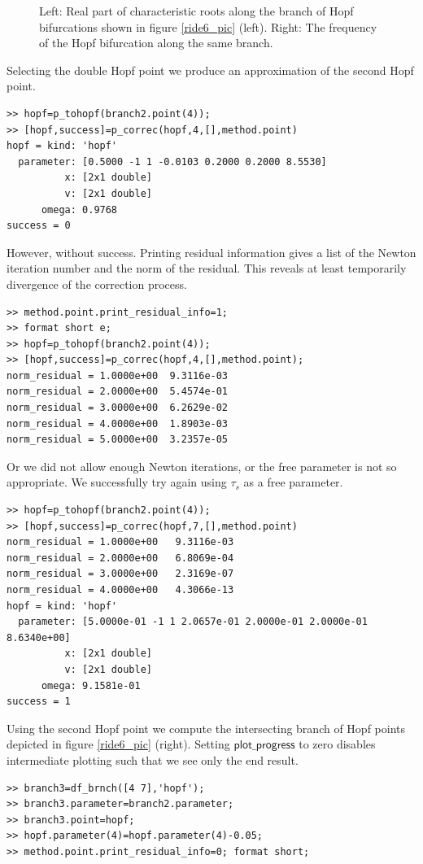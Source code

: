 \documentclass[10pt]{article}
\gdef \parm#1{{\mathsf{#1}}}
\begin{document}
{\begin{figure}[h]
\begin{center}
\end{center}
\caption{\small\label{ride7+8_pic}Left:
Real part of characteristic roots along the branch of Hopf
bifurcations shown in figure \ref{ride6_pic} (left). Right:
The frequency of the Hopf bifurcation along the same branch.} 
\end{figure}
Selecting the double Hopf point we produce an approximation of the
second Hopf point.
{\small\begin{verbatim}
>> hopf=p_tohopf(branch2.point(4));
>> [hopf,success]=p_correc(hopf,4,[],method.point)
hopf = kind: 'hopf'
  parameter: [0.5000 -1 1 -0.0103 0.2000 0.2000 8.5530]
          x: [2x1 double]
          v: [2x1 double]
      omega: 0.9768
success = 0
\end{verbatim}}
However, without success. Printing residual information
gives a list of the Newton iteration number and the
norm of the residual. This reveals 
at least temporarily divergence
of the correction process.
{\small\begin{verbatim}
>> method.point.print_residual_info=1;
>> format short e;
>> hopf=p_tohopf(branch2.point(4));
>> [hopf,success]=p_correc(hopf,4,[],method.point);
norm_residual = 1.0000e+00  9.3116e-03
norm_residual = 2.0000e+00  5.4574e-01
norm_residual = 3.0000e+00  6.2629e-02
norm_residual = 4.0000e+00  1.8903e-03
norm_residual = 5.0000e+00  3.2357e-05
\end{verbatim}}
Or we did not allow enough Newton iterations, or the free parameter
is not so appropriate.
We successfully try again using $\tau_s$ as a free parameter.
{\small\begin{verbatim}
>> hopf=p_tohopf(branch2.point(4));
>> [hopf,success]=p_correc(hopf,7,[],method.point)
norm_residual = 1.0000e+00   9.3116e-03
norm_residual = 2.0000e+00   6.8069e-04
norm_residual = 3.0000e+00   2.3169e-07
norm_residual = 4.0000e+00   4.3066e-13
hopf = kind: 'hopf'
  parameter: [5.0000e-01 -1 1 2.0657e-01 2.0000e-01 2.0000e-01 8.6340e+00]
          x: [2x1 double]
          v: [2x1 double]
      omega: 9.1581e-01
success = 1
\end{verbatim}}
Using the second Hopf point we compute the intersecting branch
of Hopf points depicted in figure \ref{ride6_pic} (right).
Setting $\parm{plot\_progress}$ to zero disables intermediate plotting
such that we see only the end result.
{\small\begin{verbatim}
>> branch3=df_brnch([4 7],'hopf');
>> branch3.parameter=branch2.parameter;
>> branch3.point=hopf;
>> hopf.parameter(4)=hopf.parameter(4)-0.05;
>> method.point.print_residual_info=0; format short;

\end{verbatim}}}
\end{document}

